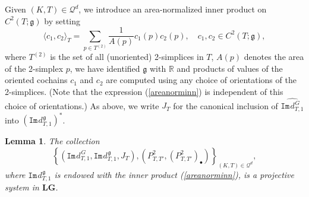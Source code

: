 \documentclass[11pt,reqno]{amsart}
\numberwithin{equation}{section}
\newtheorem{lemma}[theorem]{Lemma}
\theoremstyle{remark}
\theoremstyle{rmdefinition}
\newcommand{\R}{{\mathbb R}}
\begin{document}
Given $(K,T)\in \mathcal{Q}^d$, we introduce an area-normalized inner product on $C^2(T;\mathfrak{g})$ by setting
\begin{equation}\label{areanorminn}
\langle c_1, c_2 \rangle_T=\sum_{p \in T^{(2)}} \frac{1}{A(p)}c_1(p)c_2(p),\quad c_1,c_2 \in C^2(T;\mathfrak{g}),
\end{equation}
where $T^{(2)}$ is the set of all (unoriented) 2-simplices in $T$, $A(p)$ denotes the area of the 2-simplex $p$, we have identified $\mathfrak{g}$ with $\R$ and products of  values of the oriented cochains $c_1$ and $c_2$ are computed using any choice of orientations of the 2-simplices. (Note that the expression (\ref{areanorminn}) is independent of this choice of orientations.) As above, we write $J_T$ for the canonical inclusion of  $\widehat{\mathtt{Im}\hspace{1pt}d_{T,1}^{\hspace{1pt}G}}$ into $(\mathtt{Im}\hspace{1pt}d_{T,1}^{\hspace{1pt}\mathfrak g})^*$.
\begin{lemma}
The collection
\begin{equation}\label{prpjistll}
	\left\{(\mathtt{Im}\hspace{1pt}d_{T,1}^{\hspace{1pt}G},\mathtt{Im}\hspace{1pt}d_{T,1}^{\hspace{1pt}\mathfrak g},J_T),( P^2_{T,T'},(P^2_{T,T'})_{\bullet})\right\}_{(K,T) \in \mathcal{Q}^d},
\end{equation} 
where $\mathtt{Im}\hspace{1pt}d_{T,1}^{\hspace{1pt}\mathfrak g}$ is endowed with the inner product (\ref{areanorminn}),    is a projective system in $\mathbf{LG}$.
\end{lemma}
\end{document}
